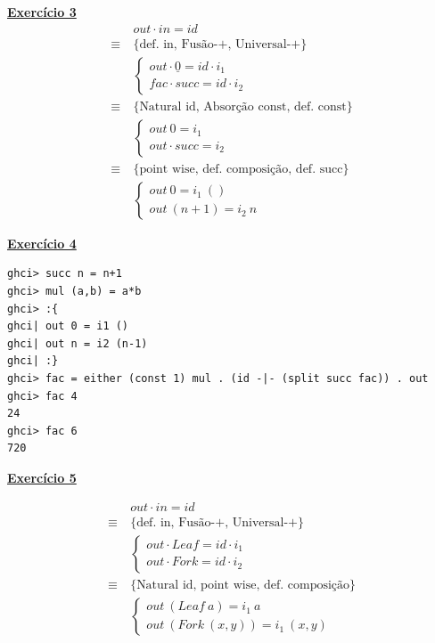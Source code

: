 \documentclass[a4paper,11pt]{article}
\begin{document}
	\noindent \underline{\textbf{Exercício 3}}\\
	\[
	\begin{aligned}
		&out \cdot in = id \\
		\equiv \  &\{\text{def. in, Fusão-+, Universal-+}\}\\
		&\begin{cases}
			out \cdot \underline{0} = id \cdot i_1 \\
			fac \cdot succ = id \cdot i_2
		\end{cases}\\
		\equiv \  &\{\text{Natural id, Absorção const, def. const}\}\\
		&\begin{cases}
			out \ 0 = i_1 \\
			out \cdot succ = i_2
		\end{cases}\\
		\equiv \  &\{\text{point wise, def. composição, def. succ}\}\\
		&\begin{cases}
			out \ 0 = i_1 \ () \\
			out \ (n + 1) = i_2 \ n
		\end{cases}
	\end{aligned}
	\]
	
	\noindent \underline{\textbf{Exercício 4}}
\begin{verbatim}
ghci> succ n = n+1
ghci> mul (a,b) = a*b
ghci> :{
ghci| out 0 = i1 ()
ghci| out n = i2 (n-1)
ghci| :}
ghci> fac = either (const 1) mul . (id -|- (split succ fac)) . out
ghci> fac 4
24
ghci> fac 6
720
\end{verbatim}
	
	\noindent \underline{\textbf{Exercício 5}}
	\begin{figure}[H]
		\centering
	\end{figure}
	\[
	\begin{aligned}
		&out \cdot in = id \\
		\equiv \  &\{\text{def. in, Fusão-+, Universal-+}\}\\
		&\begin{cases}
			out \cdot Leaf = id \cdot i_1 \\
			out \cdot Fork = id \cdot i_2
		\end{cases}\\
		\equiv \  &\{\text{Natural id, point wise, def. composição}\}\\
		&\begin{cases}
			out \ (Leaf \ a) = i_1 \ a \\
			out \ (Fork \ (x, y)) = i_1 \ (x, y)
		\end{cases}
	\end{aligned}
	\]
	
\end{document}

